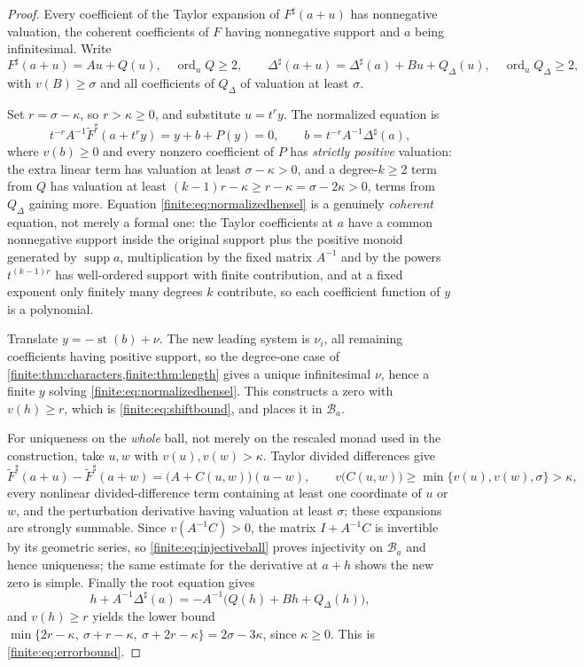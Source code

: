 \documentclass[11pt,letterpaper]{article}
\theoremstyle{definition}
\theoremstyle{remark}
\newcommand{\sh}{^{\sharp}}
\DeclareMathOperator{\supp}{supp}
\DeclareMathOperator{\st}{st}
\DeclareMathOperator{\ord}{ord}
\numberwithin{equation}{section}
\begin{document}
\begin{proof}
Every coefficient of the Taylor expansion of $F\sh(a+u)$ has nonnegative valuation, the coherent coefficients of $F$ having nonnegative support and $a$ being infinitesimal. Write
\[
 F\sh(a+u)=Au+Q(u),\quad \ord_uQ\geq2,
 \qquad
 \Delta\sh(a+u)=\Delta\sh(a)+Bu+Q_\Delta(u),\quad \ord_uQ_\Delta\geq2,
\]
with $v(B)\geq\sigma$ and all coefficients of $Q_\Delta$ of valuation at least $\sigma$.

Set $r=\sigma-\kappa$, so $r>\kappa\geq0$, and substitute $u=t^ry$. The normalized equation is
\begin{equation}\label{finite:eq:normalizedhensel}
 t^{-r}A^{-1}\widetilde F\sh(a+t^ry)=y+b+P(y)=0,
 \qquad b=t^{-r}A^{-1}\Delta\sh(a),
\end{equation}
where $v(b)\geq0$ and every nonzero coefficient of $P$ has \emph{strictly positive} valuation: the extra linear term has valuation at least $\sigma-\kappa>0$, and a degree-$k\geq2$ term from $Q$ has valuation at least $(k-1)r-\kappa\geq r-\kappa=\sigma-2\kappa>0$, terms from $Q_\Delta$ gaining more. Equation \eqref{finite:eq:normalizedhensel} is a genuinely \emph{coherent} equation, not merely a formal one: the Taylor coefficients at $a$ have a common nonnegative support inside the original support plus the positive monoid generated by $\supp a$, multiplication by the fixed matrix $A^{-1}$ and by the powers $t^{(k-1)r}$ has well-ordered support with finite contribution, and at a fixed exponent only finitely many degrees $k$ contribute, so each coefficient function of $y$ is a polynomial.

Translate $y=-\st(b)+\nu$. The new leading system is $\nu_i$, all remaining coefficients having positive support, so the degree-one case of \cref{finite:thm:characters,finite:thm:length} gives a unique infinitesimal $\nu$, hence a finite $y$ solving \eqref{finite:eq:normalizedhensel}. This constructs a zero with $v(h)\geq r$, which is \eqref{finite:eq:shiftbound}, and places it in $\mathcal B_a$.

For uniqueness on the \emph{whole} ball, not merely on the rescaled monad used in the construction, take $u,w$ with $v(u),v(w)>\kappa$. Taylor divided differences give
\begin{equation}\label{finite:eq:injectiveball}
 \widetilde F\sh(a+u)-\widetilde F\sh(a+w)=\bigl(A+C(u,w)\bigr)(u-w),
 \qquad
 v\bigl(C(u,w)\bigr)\geq\min\{v(u),v(w),\sigma\}>\kappa,
\end{equation}
every nonlinear divided-difference term containing at least one coordinate of $u$ or $w$, and the perturbation derivative having valuation at least $\sigma$; these expansions are strongly summable. Since $v(A^{-1}C)>0$, the matrix $I+A^{-1}C$ is invertible by its geometric series, so \eqref{finite:eq:injectiveball} proves injectivity on $\mathcal B_a$ and hence uniqueness; the same estimate for the derivative at $a+h$ shows the new zero is simple. Finally the root equation gives
\[
 h+A^{-1}\Delta\sh(a)=-A^{-1}\bigl(Q(h)+Bh+Q_\Delta(h)\bigr),
\]
and $v(h)\geq r$ yields the lower bound $\min\{2r-\kappa,\ \sigma+r-\kappa,\ \sigma+2r-\kappa\}=2\sigma-3\kappa$, since $\kappa\geq0$. This is \eqref{finite:eq:errorbound}.
\end{proof}
\end{document}
